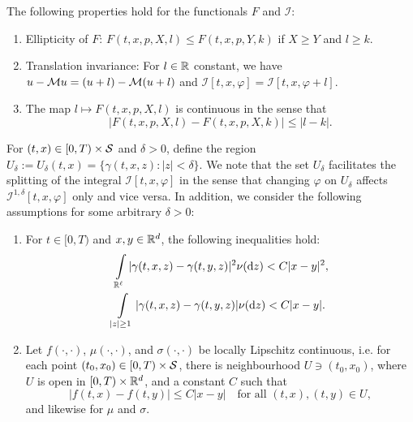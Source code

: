 \begin{remark}
\label{remark: Remark 5.1 in Seydel}
    The following properties hold for the functionals $F$ and $\mathcal I$:
    \begin{enumerate}[label=(\textup{P}\arabic*), ref=(\textup{P}\arabic*)]
        \item \label{ass: P1} Ellipticity of $F$: $F(t,x,p,X,l) \leq F(t,x,p,Y,k)$ if $X \geq Y$ and $l \geq k$.
        \item \label{ass: P2} Translation invariance: For $l \in \mathbb{R}$ constant, we have $u - \mathcal{M} u = (u+l)- \mathcal{M} (u+l)$ and $\mathcal{I}[t,x,\varphi] = \mathcal{I}[t,x,\varphi + l]$. 
        \item \label{ass: P3} The map $l \mapsto F(t,x,p,X,l)$ is continuous in the sense that
        \begin{equation*}
            \big|F(t,x,p,X,l) - F(t,x,p,X,k)\big| \leq |l-k|. 
        \end{equation*}
    \end{enumerate}
\end{remark}

For $(t,x) \in [0,T) \times \mathcal{S}$ and $\delta > 0$, define the region $U_\delta := U_\delta (t,x) = \{ \gamma (t,x,z): |z| < \delta \}$. We note that the set $U_\delta$ facilitates the splitting of the integral $\mathcal{I}[t,x,\varphi]$ in the sense that changing $\varphi$ on $U_\delta$ affects $\mathcal{I}^{1,\delta}[t,x,\varphi]$ only and vice versa. In addition, we consider the following assumptions for some arbitrary $\delta > 0$:

\begin{assumption}
    \label{ass: Assumption 2.4 in Seydel}
    \begin{enumerate}[label=(\textup{B}\arabic*), ref=(\textup{B}\arabic*)]
        \item \label{ass: B1} For $t \in [0,T)$ and $x,y \in \mathbb{R}^d$, the following inequalities hold: 
            \begin{align*}
                \int\limits_{\mathbb R^\ell} |\gamma (t,x,z) - \gamma (t,y,z)|^2 \nu(\mathrm{d} z) < C|x-y|^2 &, \\
                \int\limits_{|z|\geq 1} |\gamma (t,x,z) - \gamma (t,y,z)| \nu(\mathrm{d} z) < C|x-y|.
            \end{align*}
        \item \label{ass: B2} Let $f(\cdot, \cdot)$, $\mu(\cdot, \cdot)$, and $\sigma(\cdot, \cdot)$ be locally Lipschitz continuous, i.e. for each point $(t_0,x_0) \in [0,T) \times \mathcal{S}$, there is neighbourhood $U \ni (t_0,x_0)$, where $U$ is open in $[0,T) \times \mathbb{R}^d$, and a constant $C$ such that 
        \begin{equation*}
            |f(t,x) - f(t,y)| \leq C|x-y| \quad \text{for all } (t,x), (t,y) \in U,
        \end{equation*}
        and likewise for $\mu$ and $\sigma$.
    \end{enumerate}
\end{assumption}

